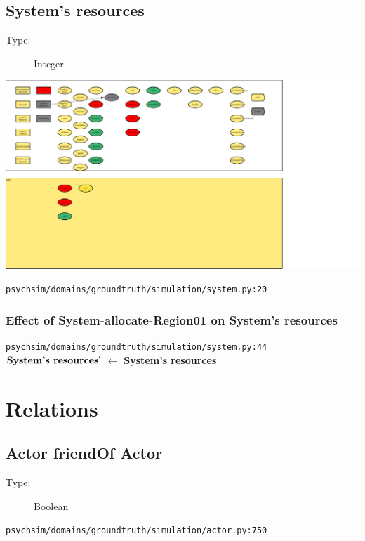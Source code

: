 \documentclass{article}%
\begin{document}
%
\subsection{System's resources}%
\label{subsec:System's resources}%
\begin{description}%
\item[Type:]%
Integer%
\end{description}%
\includegraphics[width=\textwidth]{images/resourcesOfSystem.png}%
\begin{flushleft}%
\verb|psychsim/domains/groundtruth/simulation/system.py:20|%
\end{flushleft}%
\subsubsection{Effect of System{-}allocate{-}Region01 on System's resources}%
\label{ssubsec:Effect of System{-}allocate{-}Region01 on System's resources}%
\begin{flushleft}%
\verb|psychsim/domains/groundtruth/simulation/system.py:44|%
\linebreak%
$\mbox{\textbf{System's resources}} '$%
$\leftarrow$%
\textbf{System's resources}%
\end{flushleft}

%
\section{Relations}%
\label{sec:Relations}%
\subsection{Actor friendOf Actor}%
\label{subsec:Actor friendOf Actor}%
\begin{description}%
\item[Type:]%
Boolean%
\end{description}%
\begin{flushleft}%
\verb|psychsim/domains/groundtruth/simulation/actor.py:750|%
\end{flushleft}
\end{document}
